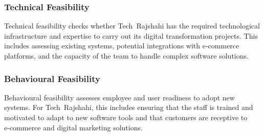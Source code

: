 \documentclass[12pt,a4paper]{article}
\begin{document}
\subsubsection{Technical Feasibility}
Technical feasibility checks whether Tech Rajshahi has the required technological infrastructure and expertise to carry out its digital transformation projects.  This includes assessing existing systems, potential integrations with e‑commerce platforms, and the capacity of the team to handle complex software solutions.

\subsubsection{Behavioural Feasibility}
Behavioural feasibility assesses employee and user readiness to adopt new systems.  For Tech Rajshahi, this includes ensuring that the staff is trained and motivated to adapt to new software tools and that customers are receptive to e‑commerce and digital marketing solutions.

\newpage
\end{document}
